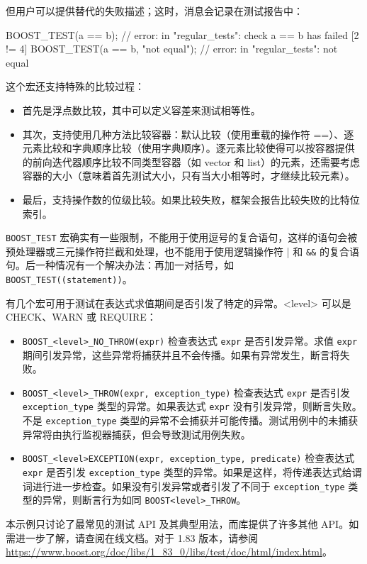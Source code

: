 但用户可以提供替代的失败描述；这时，消息会记录在测试报告中：

\begin{cpp}
BOOST_TEST(a == b);
// error: in "regular_tests": check a == b has failed [2 != 4]
BOOST_TEST(a == b, "not equal");
// error: in "regular_tests": not equal
\end{cpp}

这个宏还支持特殊的比较过程：

\begin{itemize}
\item
首先是浮点数比较，其中可以定义容差来测试相等性。

\item
其次，支持使用几种方法比较容器：默认比较（使用重载的操作符 ==）、逐元素比较和字典顺序比较（使用字典顺序）。逐元素比较使得可以按容器提供的前向迭代器顺序比较不同类型容器（如 vector 和 list）的元素，还需要考虑容器的大小（意味着首先测试大小，只有当大小相等时，才继续比较元素）。

\item
最后，支持操作数的位级比较。如果比较失败，框架会报告比较失败的比特位索引。
\end{itemize}

\verb|BOOST_TEST| 宏确实有一些限制，不能用于使用逗号的复合语句，这样的语句会被预处理器或三元操作符拦截和处理，也不能用于使用逻辑操作符 \verb||| 和 \verb|&&| 的复合语句。后一种情况有一个解决办法：再加一对括号，如 \verb|BOOST_TEST((statement))|。

有几个宏可用于测试在表达式求值期间是否引发了特定的异常。<level> 可以是 CHECK、WARN 或 REQUIRE：

\begin{itemize}
\item
\verb|BOOST_<level>_NO_THROW(expr)| 检查表达式 \verb|expr| 是否引发异常。求值 \verb|expr| 期间引发异常，这些异常将捕获并且不会传播。如果有异常发生，断言将失败。

\item
\verb|BOOST_<level>_THROW(expr, exception_type)| 检查表达式 \verb|expr| 是否引发 \verb|exception_type| 类型的异常。如果表达式 \verb|expr| 没有引发异常，则断言失败。不是 \verb|exception_type| 类型的异常不会捕获并可能传播。测试用例中的未捕获异常将由执行监视器捕获，但会导致测试用例失败。

\item
\verb|BOOST_<level>EXCEPTION(expr, exception_type, predicate)| 检查表达式 \verb|expr| 是否引发 \verb|exception_type| 类型的异常。如果是这样，将传递表达式给谓词进行进一步检查。如果没有引发异常或者引发了不同于 \verb|exception_type| 类型的异常，则断言行为如同 \verb|BOOST<level>_THROW|。
\end{itemize}

本示例只讨论了最常见的测试 API 及其典型用法，而库提供了许多其他 API。如需进一步了解，请查阅在线文档。对于 1.83 版本，请参阅 \url{https://www.boost.org/doc/libs/1_83_0/libs/test/doc/html/index.html}。


